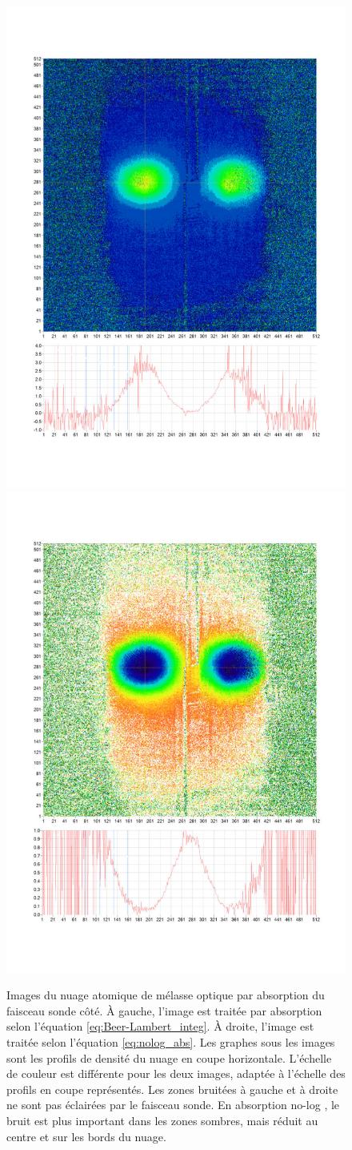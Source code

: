 \begin{figure}[!h]
\centering
\includegraphics[width=0.4\linewidth]{figures/setup/coldatoms/log_abs}
\hspace{.1\linewidth}
\includegraphics[width=0.4\linewidth]{figures/setup/coldatoms/nolog_abs}
\caption[Absorption \og no-log \fg{} ]{
Images du nuage atomique de mélasse optique par absorption du faisceau sonde côté.
\`A gauche, l'image est traitée par absorption selon l'équation \eqref{eq:Beer-Lambert_integ}.
\`A droite, l'image est traitée selon l'équation \eqref{eq:nolog_abs}.
Les graphes sous les images sont les profils de densité du nuage en coupe horizontale.
L'échelle de couleur est différente pour les deux images, adaptée à l'échelle des profils en coupe représentés.
Les zones bruitées à gauche et à droite ne sont pas éclairées par le faisceau sonde. 
En absorption \og no-log \fg{}, le bruit est plus important dans les zones sombres, mais réduit au centre et sur les bords du nuage.
}
\label{fig:nolog_abs}
\end{figure}	

